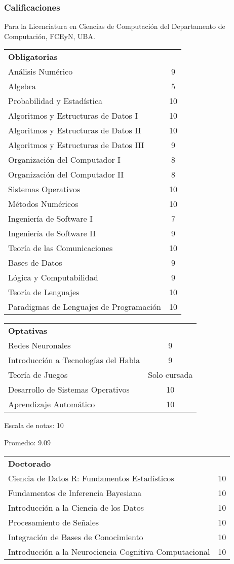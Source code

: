 \documentclass[a4paper,10pt]{article}
\begin{document}
\subsubsection{Calificaciones}

Para la Licenciatura en Ciencias de Computación del Departamento de
Computación, FCEyN, UBA.

\begin{tabular}{ l c }

\textbf{Obligatorias} \smallskip  & \\ 
Análisis Numérico & 9\\
Algebra & 5\\
Probabilidad y Estadística & 10\\
Algoritmos y Estructuras de Datos I & 10\\
Algoritmos y Estructuras de Datos II & 10\\
Algoritmos y Estructuras de Datos III & 9\\
Organización del Computador I & 8\\
Organización del Computador II & 8\\
Sistemas Operativos & 10\\
Métodos Numéricos & 10\\
Ingeniería de Software I & 7\\
Ingeniería de Software II & 9\\
Teoría de las Comunicaciones & 10\\
Bases de Datos & 9\\
Lógica y Computabilidad & 9\\
Teoría de Lenguajes & 10\\
Paradigmas de Lenguajes de Programación & 10\\
\end{tabular}

\medskip
\begin{tabular}{l c}
\textbf{Optativas} \smallskip & \\
Redes Neuronales & 9\\
Introducción a Tecnologías del Habla & 9\\
Teoría de Juegos & Solo cursada\\
Desarrollo de Sistemas Operativos & 10\\
Aprendizaje Automático & 10\\
\end{tabular}
\bigskip

Escala de notas: 10

Promedio: 9.09

\bigskip
\begin{tabular}{l c}
\textbf{Doctorado} \smallskip & \\
Ciencia de Datos R: Fundamentos Estadísticos & 10 \\
Fundamentos de Inferencia Bayesiana & 10 \\
Introducción a la Ciencia de los Datos & 10 \\ 
Procesamiento de Señales & 10 \\
Integración de Bases de Conocimiento & 10 \\
Introducción a la Neurociencia Cognitiva Computacional & 10 \\
\end{tabular}
\end{document}
